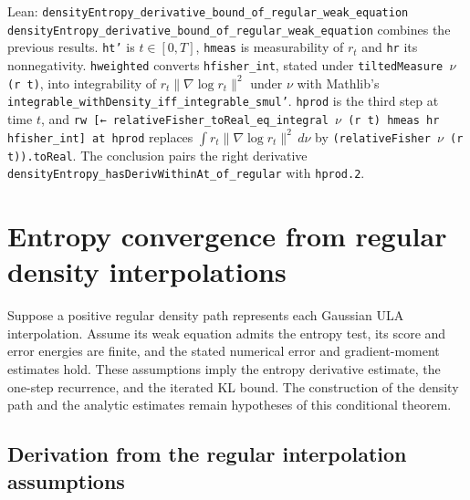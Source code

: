 \documentclass[11pt,a4paper]{report}
\begin{document}
\begin{leanbox}{Lean: \texttt{densityEntropy\_\allowbreak{}derivative\_\allowbreak{}bound\_\allowbreak{}of\_\allowbreak{}regular\_\allowbreak{}weak\_\allowbreak{}equation}}
\texttt{density\allowbreak{}Entropy\_\allowbreak{}derivative\_\allowbreak{}bound\_\allowbreak{}of\_\allowbreak{}regular\_\allowbreak{}weak\_\allowbreak{}equation} combines the previous results. \texttt{ht'} is \(t\in[0,T]\), \texttt{hmeas} is measurability of \(r_t\) and \texttt{hr} its nonnegativity. \texttt{hweighted} converts \texttt{hfisher\_\allowbreak{}int}, stated under \texttt{tilted\allowbreak{}Measure \ensuremath{\nu} (r t)}, into integrability of \(r_t\|\nabla\log r_t\|^2\) under \(\nu\) with Mathlib's \texttt{integrable\_\allowbreak{}with\allowbreak{}Density\_\allowbreak{}iff\_\allowbreak{}integrable\_\allowbreak{}smul'}. \texttt{hprod} is the third step at time \(t\), and \texttt{rw [← relative\allowbreak{}Fisher\_\allowbreak{}to\allowbreak{}Real\_\allowbreak{}eq\_\allowbreak{}integral \ensuremath{\nu} (r t) hmeas hr hfisher\_\allowbreak{}int] at hprod} replaces \(\int r_t\|\nabla\log r_t\|^2\,d\nu\) by \texttt{(relative\allowbreak{}Fisher \ensuremath{\nu} (r t)).\allowbreak{}to\allowbreak{}Real}. The conclusion pairs the right derivative \texttt{density\allowbreak{}Entropy\_\allowbreak{}has\allowbreak{}Deriv\allowbreak{}Within\allowbreak{}At\_\allowbreak{}of\_\allowbreak{}regular} with \texttt{hprod.\allowbreak{}2}.
\end{leanbox}
\section{\texorpdfstring{Entropy convergence from regular density interpolations}{Entropy convergence from regular density interpolations}}
\label{proof-module-UnadjustedLangevin-LSI-RegularizedTheorem-lean}


Suppose a positive regular density path represents each Gaussian ULA interpolation. Assume its weak equation admits the entropy test, its score and error energies are finite, and the stated numerical error and gradient-moment estimates hold. These assumptions imply the entropy derivative estimate, the one-step recurrence, and the iterated KL bound. The construction of the density path and the analytic estimates remain hypotheses of this conditional theorem.

\subsection{\texorpdfstring{Derivation from the regular interpolation assumptions}{Derivation from the regular interpolation assumptions}}
\label{report-step-UnadjustedLangevin-LSI-RegularizedTheorem-lean-1}
\end{document}
